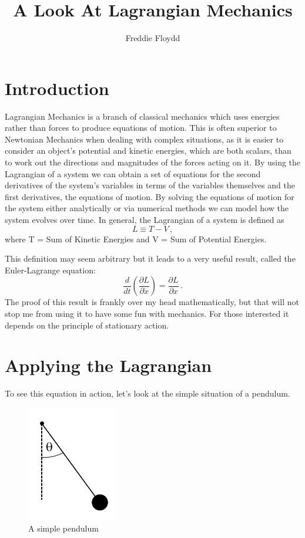 \documentclass{article}
\title{A Look At Lagrangian Mechanics}
\author{Freddie Floydd}
\begin{document}
\maketitle

\section{Introduction}
Lagrangian Mechanics is a branch of classical mechanics which uses energies rather than forces to produce equations of motion. This is often superior to Newtonian Mechanics when dealing with complex situations, as it is easier to consider an object's potential and kinetic energies, which are both scalars, than to work out the directions and magnitudes of the forces acting on it. By using the Lagrangian of a system we can obtain a set of equations for the second derivatives of the system's variables in terms of the variables themselves and the first derivatives, the equations of motion. By solving the equations of motion for the system either analytically or via numerical methods we can model how the system evolves over time. In general, the Lagrangian of a system is defined as
$$ L \equiv T - V \, ,$$
where T = Sum of Kinetic Energies and V = Sum of Potential Energies.

This definition may seem arbitrary but it leads to a very useful result, called the Euler-Lagrange equation:
$$ \frac{d}{dt} \left( \frac{\partial L}{\partial \dot{x}} \right) = \frac{\partial L}{\partial x} \, .$$   
The proof of this result is frankly over my head mathematically, but that will not stop me from using it to have some fun with mechanics. For those interested it depends on the principle of stationary action.

\section{Applying the Lagrangian}
To see this equation in action, let's look at the simple situation of a pendulum.

\begin{figure}[ht]
\centering
\includegraphics[width=4cm]{Lagrangian_Pendulum.jpg}
\caption{A simple pendulum}
\end{figure}
\end{document}
